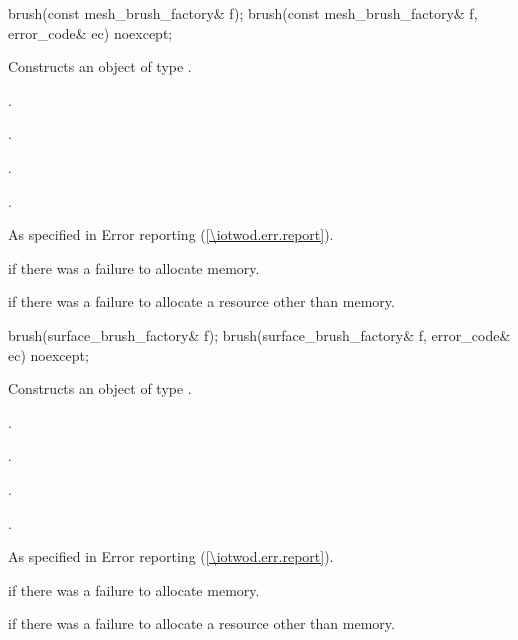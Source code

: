 \begin{itemdecl}
    brush(const mesh_brush_factory& f);
    brush(const mesh_brush_factory& f, error_code& ec) noexcept;
\end{itemdecl}
\begin{itemdescr}
	\pnum
	\effects
	Constructs an object of type .
	
	\pnum
	\postconditions
	.
	
	.
	
	.
	
	.

	\pnum
	\throws
	As specified in Error reporting (\ref{\iotwod.err.report}).
	
	\pnum
	\errors
	 if there was a failure to allocate memory.
	
	 if there was a failure to allocate a resource other than memory.
	
\end{itemdescr}

\begin{itemdecl}
    brush(surface_brush_factory& f);
    brush(surface_brush_factory& f, error_code& ec) noexcept;
\end{itemdecl}
\begin{itemdescr}
	\pnum
	\effects
	Constructs an object of type .
	
	\pnum
	\postconditions
	.
	
	.
	
	.
	
	.

	\pnum
	\throws
	As specified in Error reporting (\ref{\iotwod.err.report}).
	
	\pnum
	\errors
	 if there was a failure to allocate memory.
	
	 if there was a failure to allocate a resource other than memory.
	
\end{itemdescr}


